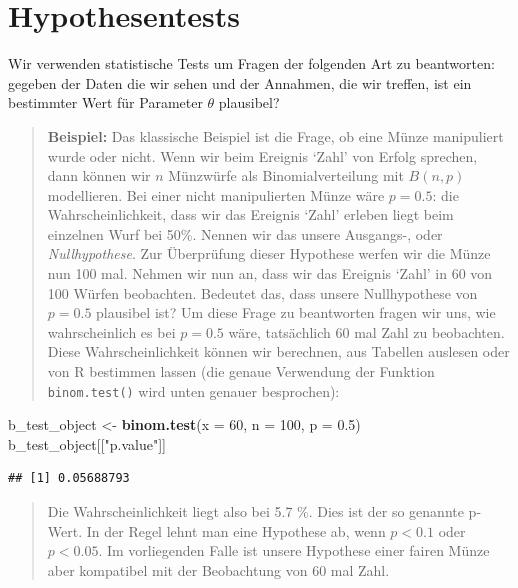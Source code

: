 \documentclass[]{book}
\newenvironment{Shaded}{\begin{snugshade}}{\end{snugshade}}
\newcommand{\KeywordTok}[1]{\textcolor[rgb]{0.13,0.29,0.53}{\textbf{#1}}}
\newcommand{\DataTypeTok}[1]{\textcolor[rgb]{0.13,0.29,0.53}{#1}}
\newcommand{\DecValTok}[1]{\textcolor[rgb]{0.00,0.00,0.81}{#1}}
\newcommand{\FloatTok}[1]{\textcolor[rgb]{0.00,0.00,0.81}{#1}}
\newcommand{\StringTok}[1]{\textcolor[rgb]{0.31,0.60,0.02}{#1}}
\newcommand{\NormalTok}[1]{#1}
\begin{document}
\section{Hypothesentests}\label{hypothesentests}

Wir verwenden statistische Tests um Fragen der folgenden Art zu
beantworten: gegeben der Daten die wir sehen und der Annahmen, die wir
treffen, ist ein bestimmter Wert für Parameter \(\theta\) plausibel?

\begin{quote}
\textbf{Beispiel:} Das klassische Beispiel ist die Frage, ob eine Münze
manipuliert wurde oder nicht. Wenn wir beim Ereignis `Zahl' von Erfolg
sprechen, dann können wir \(n\) Münzwürfe als Binomialverteilung mit
\(B(n,p)\) modellieren. Bei einer nicht manipulierten Münze wäre
\(p=0.5\): die Wahrscheinlichkeit, dass wir das Ereignis `Zahl' erleben
liegt beim einzelnen Wurf bei 50\%. Nennen wir das unsere Ausgangs-,
oder \emph{Nullhypothese}. Zur Überprüfung dieser Hypothese werfen wir
die Münze nun 100 mal. Nehmen wir nun an, dass wir das Ereignis `Zahl'
in 60 von 100 Würfen beobachten. Bedeutet das, dass unsere Nullhypothese
von \(p=0.5\) plausibel ist? Um diese Frage zu beantworten fragen wir
uns, wie wahrscheinlich es bei \(p=0.5\) wäre, tatsächlich 60 mal Zahl
zu beobachten. Diese Wahrscheinlichkeit können wir berechnen, aus
Tabellen auslesen oder von R bestimmen lassen (die genaue Verwendung der
Funktion \texttt{binom.test()} wird unten genauer besprochen):
\end{quote}

\begin{Shaded}
\begin{Highlighting}[]
\NormalTok{b_test_object <-}\StringTok{ }\KeywordTok{binom.test}\NormalTok{(}\DataTypeTok{x =} \DecValTok{60}\NormalTok{, }\DataTypeTok{n =} \DecValTok{100}\NormalTok{, }\DataTypeTok{p =} \FloatTok{0.5}\NormalTok{)}
\NormalTok{b_test_object[[}\StringTok{"p.value"}\NormalTok{]]}
\end{Highlighting}
\end{Shaded}

\begin{verbatim}
## [1] 0.05688793
\end{verbatim}

\begin{quote}
Die Wahrscheinlichkeit liegt also bei 5.7 \%. Dies ist der so genannte
p-Wert. In der Regel lehnt man eine Hypothese ab, wenn \(p<0.1\) oder
\(p<0.05\). Im vorliegenden Falle ist unsere Hypothese einer fairen
Münze aber kompatibel mit der Beobachtung von 60 mal Zahl.
\end{quote}
\end{document}
